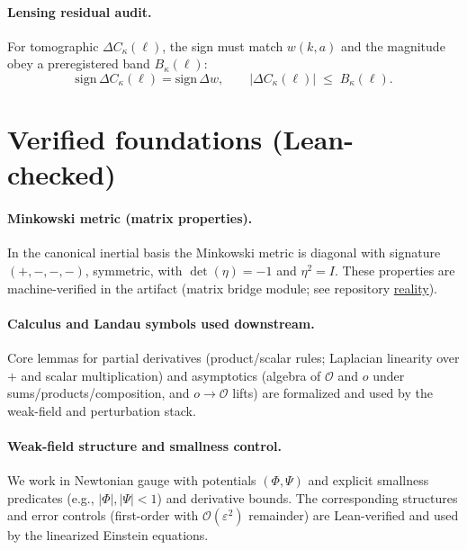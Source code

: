\documentclass[11pt]{article}
\begin{document}
\paragraph{Lensing residual audit.}
For tomographic $\Delta C_\kappa(\ell)$, the sign must match $w(k,a)$ and the magnitude obey a preregistered band $B_\kappa(\ell)$:
\[
\mathrm{sign}\,\Delta C_\kappa(\ell)=\mathrm{sign}\,\Delta w,\qquad |\Delta C_\kappa(\ell)|\;\le\; B_\kappa(\ell).
\]


\section{Verified foundations (Lean-checked)}\label{sec:verified-foundations}

\paragraph{Minkowski metric (matrix properties).}
In the canonical inertial basis the Minkowski metric is diagonal with signature $(+,-,-,-)$, symmetric, with $\det(\eta)=-1$ and $\eta^2=I$. These properties are machine-verified in the artifact (matrix bridge module; see repository \href{https://github.com/jonwashburn/reality}{reality}).

\paragraph{Calculus and Landau symbols used downstream.}
Core lemmas for partial derivatives (product/scalar rules; Laplacian linearity over $+$ and scalar multiplication) and asymptotics (algebra of $\mathcal{O}$ and $o$ under sums/products/composition, and $o\!\to\!\mathcal{O}$ lifts) are formalized and used by the weak-field and perturbation stack.

\paragraph{Weak-field structure and smallness control.}
We work in Newtonian gauge with potentials $(\Phi,\Psi)$ and explicit smallness predicates (e.g., $|\Phi|,|\Psi|<1$) and derivative bounds. The corresponding structures and error controls (first-order with $\mathcal{O}(\varepsilon^2)$ remainder) are Lean-verified and used by the linearized Einstein equations.
\end{document}
